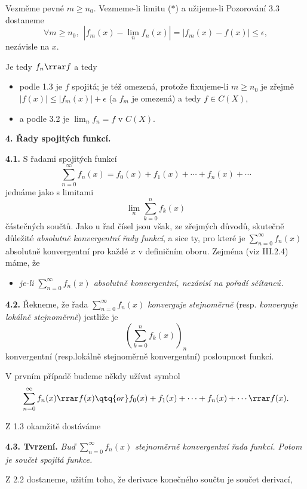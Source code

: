 \documentclass[12pt]{article}
\begin{document}
Vezměme pevné $m\geq n_0$. Vezmeme-li limitu ($*$) a  užijeme-li Pozorování	3.3 dostaneme
$$
\forall m\geq n_0, \ \  |f_m(x)-\lim_nf_n(x)|=|f_m(x)-f(x)|\leq\epsilon,
$$
nezávisle na $x$.

Je tedy $f_n\rrar f$ a tedy
\begin{itemize}
\item podle 1.3 je $f$ spojitá; je též omezená, protože fixujeme-li $m\geq n_0$ je zřejmě $|f(x)|\leq |f_m(x)|+\epsilon$ (a $f_m$ je omezená) a tedy $f\in C(X)$,
\item a podle 3.2 je $\lim_nf_n=f$ v $C(X)$.
\end{itemize}
\sq
																					
  
 \vskip10mm
 
 {\large\bf 4. Řady spojitých funkcí.}

\bigskip
 
{\bf 4.1.} S řadami spojitých funkcí
$$
\sum_{n=0}^\infty f_n(x)= f_0(x)+f_1(x)+\cdots+f_n(x)+\cdots
$$
jednáme jako s limitami
$$
\lim_n \sum_{k=0}^n f_k(x)
$$
částečných součtů.
Jako u řad čísel jsou však, ze zřejmých důvodů, skutečně důležité {\em absolutně konvergentní řady funkcí}, a sice ty, pro které je $\sum_{n=0}^\infty f_n(x)$ absolutně konvergentní pro každé $x$ v definičním oboru. Zejména  (viz III.2.4) máme, že
\begin{itemize}
\item[] {\em je-li $\sum_{n=0}^\infty f_n(x)$ absolutně konvergentní, nezávisí na pořadí sčítanců.
}
\end{itemize}
 
 \bigskip
 
 {\bf 4.2.} Řekneme, že řada $\sum_{n=0}^\infty f_n(x)$  {\em konverguje stejnoměrně}
(resp. {\em konverguje lokálně stejnoměrně}) jestliže je
$$
(\sum_{k=0}^n f_k(x))_n
$$
konvergentní (resp.lokálně stejnoměrně konvergentní) posloupnost funkcí.

 V prvním případě budeme někdy užívat symbol
 $$
\sum_{n=0}^\infty f_n(x)\rrar f(x) \qtq{or} f_0(x)+f_1(x)+\cdots+f_n(x)+\cdots\rrar f(x).
$$

\bigskip

Z 1.3 okamžitě dostáváme

\medskip

{\bf 4.3. Tvrzení.} {\em Buď $
\sum_{n=0}^\infty f_n(x)$ stejnoměrně konvergentní řada funkcí. Potom je součet spojitá funkce.}

\bigskip

Z 2.2 dostaneme, užitím toho, že derivace konečného součtu je součet derivací,
\end{document}
